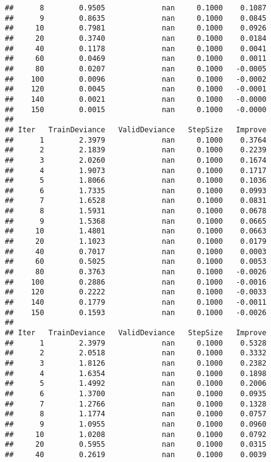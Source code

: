 \documentclass[]{article}
\begin{document}
\begin{verbatim}
##      8        0.9505             nan     0.1000    0.1087
##      9        0.8635             nan     0.1000    0.0845
##     10        0.7981             nan     0.1000    0.0926
##     20        0.3740             nan     0.1000    0.0184
##     40        0.1178             nan     0.1000    0.0041
##     60        0.0469             nan     0.1000    0.0011
##     80        0.0207             nan     0.1000   -0.0005
##    100        0.0096             nan     0.1000   -0.0002
##    120        0.0045             nan     0.1000   -0.0001
##    140        0.0021             nan     0.1000   -0.0000
##    150        0.0015             nan     0.1000   -0.0000
## 
## Iter   TrainDeviance   ValidDeviance   StepSize   Improve
##      1        2.3979             nan     0.1000    0.3764
##      2        2.1839             nan     0.1000    0.2239
##      3        2.0260             nan     0.1000    0.1674
##      4        1.9073             nan     0.1000    0.1717
##      5        1.8066             nan     0.1000    0.1036
##      6        1.7335             nan     0.1000    0.0993
##      7        1.6528             nan     0.1000    0.0831
##      8        1.5931             nan     0.1000    0.0678
##      9        1.5368             nan     0.1000    0.0665
##     10        1.4801             nan     0.1000    0.0663
##     20        1.1023             nan     0.1000    0.0179
##     40        0.7017             nan     0.1000    0.0003
##     60        0.5025             nan     0.1000    0.0053
##     80        0.3763             nan     0.1000   -0.0026
##    100        0.2886             nan     0.1000   -0.0016
##    120        0.2222             nan     0.1000   -0.0033
##    140        0.1779             nan     0.1000   -0.0011
##    150        0.1593             nan     0.1000   -0.0026
## 
## Iter   TrainDeviance   ValidDeviance   StepSize   Improve
##      1        2.3979             nan     0.1000    0.5328
##      2        2.0518             nan     0.1000    0.3332
##      3        1.8126             nan     0.1000    0.2382
##      4        1.6354             nan     0.1000    0.1898
##      5        1.4992             nan     0.1000    0.2006
##      6        1.3700             nan     0.1000    0.0935
##      7        1.2766             nan     0.1000    0.1328
##      8        1.1774             nan     0.1000    0.0757
##      9        1.0955             nan     0.1000    0.0960
##     10        1.0208             nan     0.1000    0.0792
##     20        0.5955             nan     0.1000    0.0315
##     40        0.2619             nan     0.1000    0.0039

\end{verbatim}
\end{document}
